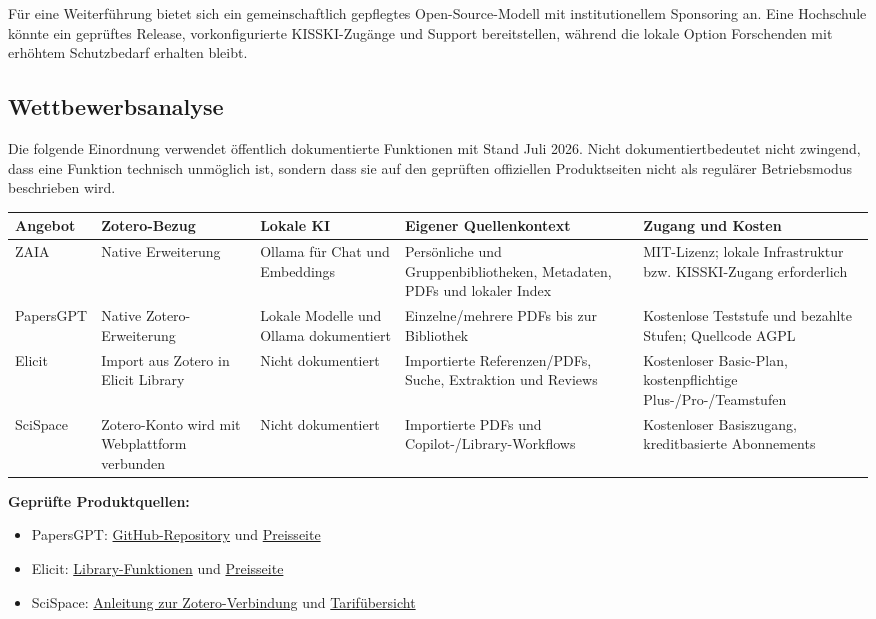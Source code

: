 \documentclass[11pt,a4paper,oneside,parskip=half]{scrartcl}
\begin{document}
Für eine Weiterführung bietet sich ein gemeinschaftlich gepflegtes
Open-Source-Modell mit institutionellem Sponsoring an. Eine Hochschule könnte
ein geprüftes Release, vorkonfigurierte KISSKI-Zugänge und Support bereitstellen,
während die lokale Option Forschenden mit erhöhtem Schutzbedarf erhalten bleibt.

\subsection{Wettbewerbsanalyse}

Die folgende Einordnung verwendet öffentlich dokumentierte Funktionen mit Stand
Juli 2026. \glqq Nicht dokumentiert\grqq bedeutet nicht zwingend, dass eine
Funktion technisch unmöglich ist, sondern dass sie auf den geprüften offiziellen
Produktseiten nicht als regulärer Betriebsmodus beschrieben wird.

\small
\noindent\begin{tabularx}{\linewidth}{@{}L{2.2cm}L{2.65cm}L{2.25cm}Y L{2.65cm}@{}}
\toprule
\textbf{Angebot} & \textbf{Zotero-Bezug} & \textbf{Lokale KI} &
\textbf{Eigener Quellenkontext} & \textbf{Zugang und Kosten} \\
\midrule
ZAIA & Native Erweiterung & Ollama für Chat und Embeddings & Persönliche und
  Gruppenbibliotheken, Metadaten, PDFs und lokaler Index & MIT-Lizenz; lokale
  Infrastruktur bzw. KISSKI-Zugang erforderlich \\
PapersGPT & Native Zotero-Erweiterung & Lokale Modelle und Ollama dokumentiert &
  Einzelne/mehrere PDFs bis zur Bibliothek & Kostenlose Teststufe und bezahlte
  Stufen; Quellcode AGPL \\
Elicit & Import aus Zotero in Elicit Library & Nicht dokumentiert & Importierte
  Referenzen/PDFs, Suche, Extraktion und Reviews & Kostenloser Basic-Plan,
  kostenpflichtige Plus-/Pro-/Teamstufen \\
SciSpace & Zotero-Konto wird mit Webplattform verbunden & Nicht dokumentiert &
  Importierte PDFs und Copilot-/Library-Workflows & Kostenloser Basiszugang,
  kreditbasierte Abonnements \\
\bottomrule
\end{tabularx}
\normalsize

\medskip
\noindent\textbf{Geprüfte Produktquellen:}
\begin{itemize}
  \item PapersGPT: \href{https://github.com/papersgpt/papersgpt-for-zotero}{
    GitHub-Repository} und \href{https://www.papersgpt.com/en/pricing}{Preisseite}
  \item Elicit: \href{https://elicit.com/solutions/library}{Library-Funktionen}
    und \href{https://elicit.com/pricing}{Preisseite}
  \item SciSpace: \href{https://scispace.com/help/en/articles/10719251-how-to-connect-scispace-with-zotero}{
    Anleitung zur Zotero-Verbindung} und
    \href{https://scispace.com/resources/credits-pricing-guide/}{Tarifübersicht}
\end{itemize}
\end{document}
